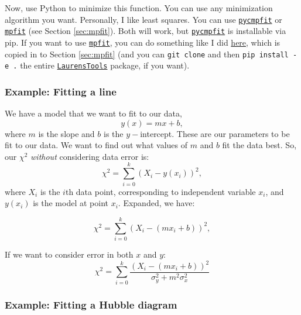 Now, use Python to minimize this function. You can use any minimization algorithm you want. Personally, I like least squares. You can use \href{https://github.com/cosmonaut/pycmpfit}{\texttt{pycmpfit}} or \href{https://github.com/segasai/astrolibpy/blob/master/mpfit/mpfit.py}{\texttt{mpfit}} (see Section \ref{sec:mpfit}). Both will work, but \href{https://github.com/cosmonaut/pycmpfit}{\texttt{pycmpfit}} is installable via pip. If you want to use \href{https://github.com/segasai/astrolibpy/blob/master/mpfit/mpfit.py}{\texttt{mpfit}}, you can do something like I did \href{https://github.com/laldoroty/LaurensTools/tree/main/LaurensTools/mpfit}{here}, which is copied in to Section \ref{sec:mpfit} (and you can \texttt{git clone} and then \texttt{pip install -e .} the entire \href{https://github.com/laldoroty/LaurensTools}{\texttt{LaurensTools}} package, if you want).

\subsubsection{Example: Fitting a line}
We have a model that we want to fit to our data,
\begin{equation}
    y(x) = mx + b,
\end{equation}
where $m$ is the slope and $b$ is the $y-$intercept. These are our parameters to be fit to our data. We want to find out what values of $m$ and $b$ fit the data best. So, our $\chi^{2}$ \textit{without} considering data error is:
\begin{equation}
    \chi^{2} = \sum_{i=0}^{k} (X_{i} - y(x_{i}))^{2},
\end{equation}
where $X_{i}$ is the $i$th data point, corresponding to independent variable $x_{i}$, and $y(x_{i})$ is the model at point $x_{i}$. Expanded, we have:

\begin{equation}
    \chi^{2} = \sum_{i=0}^{k} (X_{i} - (mx_{i} + b))^{2},
\end{equation}

If we want to consider error in both $x$ and $y$:
\begin{equation}
    \chi^{2} = \sum_{i=0}^{k} \frac{(X_{i} - (mx_{i} + b))^{2}}{\sigma_{y}^{2} + m^{2}\sigma_{x}^{2}}
\end{equation}


\subsubsection{Example: Fitting a Hubble diagram}


